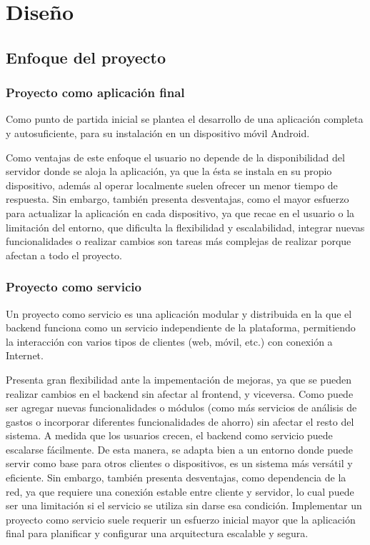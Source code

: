 \chapter{Diseño}

\section{Enfoque del proyecto}
\subsection{Proyecto como aplicación final}
Como punto de partida inicial se plantea el desarrollo de una aplicación completa y autosuficiente, para su instalación en un dispositivo móvil Android.

Como ventajas de este enfoque el usuario no depende de la disponibilidad del servidor donde se aloja la aplicación, ya que la ésta se instala en su propio dispositivo, además al operar localmente suelen ofrecer un menor tiempo de respuesta. Sin embargo, también presenta desventajas, como el mayor esfuerzo para actualizar la aplicación en cada dispositivo, ya que recae en el usuario o la limitación del entorno, que dificulta la flexibilidad y escalabilidad, integrar nuevas funcionalidades o realizar cambios son tareas más complejas de realizar porque afectan a todo el proyecto.

\subsection{Proyecto como servicio}
Un proyecto como servicio es una aplicación modular y distribuida en la que el backend funciona como un servicio independiente de la plataforma, permitiendo la interacción con varios tipos de clientes (web, móvil, etc.) con conexión a Internet. 

Presenta gran flexibilidad ante la impementación de mejoras, ya que se pueden realizar cambios en el backend sin afectar al frontend, y viceversa. Como puede ser agregar nuevas funcionalidades o módulos (como más servicios de análisis de gastos o incorporar diferentes funcionalidades de ahorro) sin afectar el resto del sistema. A medida que los usuarios crecen, el backend como servicio puede escalarse fácilmente. De esta manera, se adapta bien a un entorno donde puede servir como base para otros clientes o dispositivos, es un sistema más versátil y eficiente. Sin embargo, también presenta desventajas, como dependencia de la red, ya que requiere una conexión estable entre cliente y servidor, lo cual puede ser una limitación si el servicio se utiliza sin darse esa condición. Implementar un proyecto como servicio suele requerir un esfuerzo inicial mayor que la aplicación final para planificar y configurar una arquitectura escalable y segura\cite{galster2014variability}.\\


